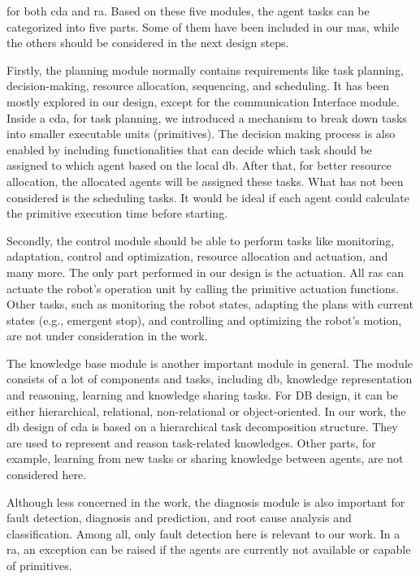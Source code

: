 for both \gls{cda} and \gls{ra}.
Based on these five modules, the agent tasks can be categorized into five parts. Some 
of them have been included in our \gls{mas}, while the others should be considered in the 
next design steps. 


Firstly, the planning module normally contains requirements like task planning, 
decision-making, 
resource allocation, sequencing, and scheduling. It has been mostly explored in our 
design, except for the communication Interface module. Inside a \gls{cda}, 
for task planning, we introduced 
a mechanism to break down tasks into smaller executable units (primitives). 
The decision 
making process is also enabled by including functionalities that can decide which task should be 
assigned to which agent based on the local \gls{db}. After that, for better resource 
allocation, the allocated agents will be assigned these tasks. What has not been 
considered is the scheduling tasks. It would be ideal if each agent could calculate 
the primitive execution time before starting.

Secondly, the control module should be able to perform tasks like monitoring, adaptation, 
control and optimization, resource allocation and actuation, and many more. The only part 
performed in our design is the actuation. All \gls{ras} can actuate the robot's operation 
unit by calling the primitive actuation functions. Other tasks, such as monitoring the 
robot states, adapting the plans with current states (e.g., emergent stop), and controlling and 
optimizing the robot's motion, are not under consideration in the work. 


The knowledge base module is another important module in general. 
The module consists of a lot of components and tasks, including \gls{db}, knowledge representation and reasoning, learning and knowledge 
sharing tasks. For DB design, it can be either hierarchical, relational, non-relational 
or object-oriented. In our work, the \gls{db} design of \gls{cda} is based on a 
hierarchical task decomposition structure. They are used to represent and reason task-related 
knowledges. 
Other parts, for example, learning from new tasks or sharing knowledge between agents, are not considered here.  


Although less concerned in the work, the diagnosis module is also important for fault 
detection, diagnosis and prediction, and root cause analysis and classification. Among all, 
only fault detection here is relevant to our work. In a \gls{ra}, an exception can be raised 
if the agents are currently not available or capable of primitives. 


